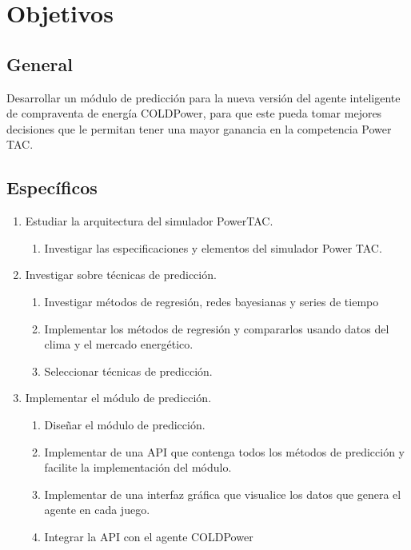 \section{Objetivos}
\subsection{General}
Desarrollar un módulo de predicción para la nueva versión del agente inteligente de compraventa de energía COLDPower, para que este pueda tomar mejores decisiones que le permitan tener una mayor ganancia en la competencia Power TAC.
\subsection{Específicos}
\renewcommand{\labelenumi}{$\bullet$ }
\renewcommand{\labelenumii}{\alph{enumii})}
\begin{enumerate}
    \item Estudiar la arquitectura del simulador PowerTAC. 
    \begin{enumerate}
        \item Investigar las especificaciones y elementos del simulador Power TAC.
    \end{enumerate} 
    \item Investigar sobre técnicas de predicción.
    \begin{enumerate}
        \item Investigar métodos de regresión, redes bayesianas y series de tiempo
		\item Implementar los métodos de regresión y compararlos usando datos del clima y el mercado energético.
		\item Seleccionar técnicas de predicción.
    \end{enumerate}
    \item Implementar el módulo de predicción.
        \begin{enumerate}
        \item Diseñar el módulo de predicción.
		\item Implementar de una API que contenga todos los métodos de predicción y facilite la implementación del módulo.
		\item Implementar de una interfaz gráfica que visualice los datos que genera el agente en cada juego.
		\item Integrar la API con el agente COLDPower
    \end{enumerate}
\end{enumerate}

